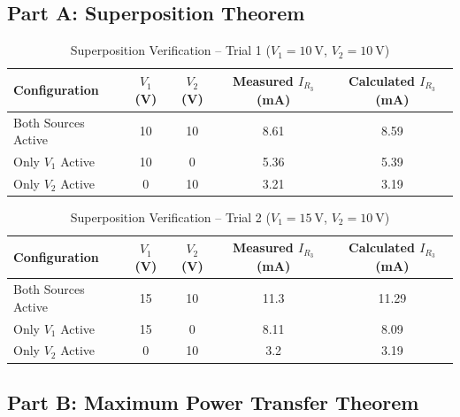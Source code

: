 \subsection{Part A: Superposition Theorem}

\begin{table}[h!]
	\centering
	\caption{Superposition Verification -- Trial 1 ($V_1=\qty{10}{\volt}$, $V_2=\qty{10}{\volt}$)}
	\vspace{2mm}
	\begin{tabular}{lcccc}
		\toprule
		\rowcolor{blue!10}
		\textbf{Configuration} & \textbf{$V_1$ (V)} & \textbf{$V_2$ (V)} & \textbf{Measured $I_{R_3}$ (mA)} & \textbf{Calculated $I_{R_3}$ (mA)} \\
		\midrule
		Both Sources Active & 10 & 10 & 8.61 & 8.59 \\
		Only $V_1$ Active & 10 & 0 & 5.36 & 5.39 \\
		Only $V_2$ Active & 0 & 10 & 3.21 & 3.19 \\
		\bottomrule
	\end{tabular}
	\label{tab:supdata1}
\end{table}

\begin{table}[h!]
	\centering
	\caption{Superposition Verification -- Trial 2 ($V_1=\qty{15}{\volt}$, $V_2=\qty{10}{\volt}$)}
	\vspace{2mm}
	\begin{tabular}{lcccc}
		\toprule
		\rowcolor{blue!10}
		\textbf{Configuration} & \textbf{$V_1$ (V)} & \textbf{$V_2$ (V)} & \textbf{Measured $I_{R_3}$ (mA)} & \textbf{Calculated $I_{R_3}$ (mA)} \\
		\midrule
		Both Sources Active & 15 & 10 & 11.3 & 11.29 \\
		Only $V_1$ Active & 15 & 0 & 8.11 & 8.09 \\
		Only $V_2$ Active & 0 & 10 & 3.2 & 3.19 \\
		\bottomrule
	\end{tabular}
	\label{tab:supdata2}
\end{table}

\subsection{Part B: Maximum Power Transfer Theorem}

